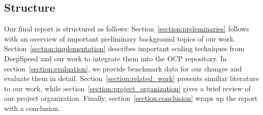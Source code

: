 \subsection{Structure}

Our final report is structured as follows: Section~\ref{section:preleminaries} follows with an overview of 
important preliminary background topics of our work. Section~\ref{section:implementation} describes important 
scaling techniques from DeepSpeed and our work to integrate them into the OCP repository. In 
section~\ref{section:evaluation}, we provide benchmark data for our changes and evaluate them in detail. 
Section~\ref{section:related_work} presents similiar literature to our work, while section~\ref{section:project_organization} 
gives a brief review of our project organization. Finally, section~\ref{section:conclusion} wraps up the 
report with a conclusion.